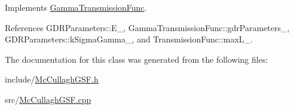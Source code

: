 Implements \hyperlink{classGammaTransmissionFunc_a68156d72ed9620f66f96dc37bbf781aa}{Gamma\-Transmission\-Func}.



References G\-D\-R\-Parameters\-::\-E\-\_\-, Gamma\-Transmission\-Func\-::gdr\-Parameters\-\_\-, G\-D\-R\-Parameters\-::k\-Sigma\-Gamma\-\_\-, and Transmission\-Func\-::max\-L\-\_\-.



The documentation for this class was generated from the following files\-:\begin{DoxyCompactItemize}
\item 
include/\hyperlink{McCullaghGSF_8h}{Mc\-Cullagh\-G\-S\-F.\-h}\item 
src/\hyperlink{McCullaghGSF_8cpp}{Mc\-Cullagh\-G\-S\-F.\-cpp}\end{DoxyCompactItemize}
